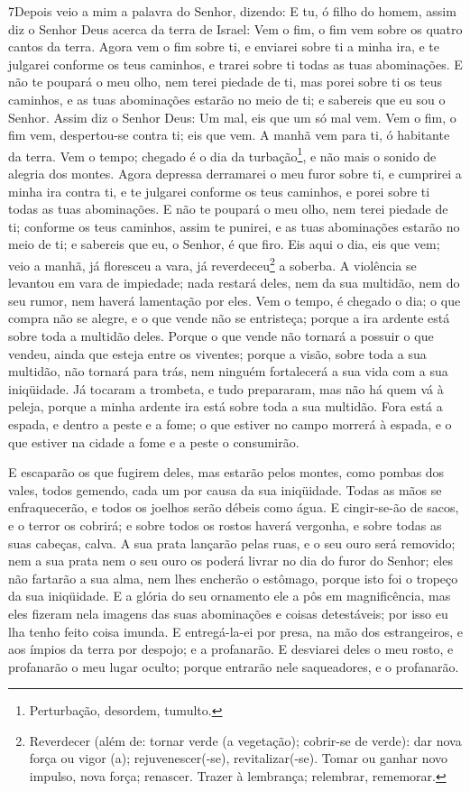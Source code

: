 \lettrine{7} Depois veio a mim a palavra do Senhor, dizendo:
E tu, ó filho do homem, assim diz o Senhor Deus acerca da terra
de Israel: Vem o fim, o fim vem sobre os quatro cantos da terra.
Agora vem o fim sobre ti, e enviarei sobre ti a minha ira, e te
julgarei conforme os teus caminhos, e trarei sobre ti todas as tuas
abominações. E não te poupará o meu olho, nem terei piedade de
ti, mas porei sobre ti os teus caminhos, e as tuas abominações
estarão no meio de ti; e sabereis que eu sou o Senhor. Assim diz
o Senhor Deus: Um mal, eis que um só mal vem. Vem o fim, o fim
vem, despertou-se contra ti; eis que vem. A manhã vem para ti, ó
habitante da terra. Vem o tempo; chegado é o dia da
turbação\footnote{Perturbação, desordem, tumulto.}, e não mais o
sonido de alegria dos montes. Agora depressa derramarei o meu
furor sobre ti, e cumprirei a minha ira contra ti, e te julgarei
conforme os teus caminhos, e porei sobre ti todas as tuas
abominações. E não te poupará o meu olho, nem terei piedade de
ti; conforme os teus caminhos, assim te punirei, e as tuas
abominações estarão no meio de ti; e sabereis que eu, o Senhor, é
que firo. Eis aqui o dia, eis que vem; veio a manhã, já
floresceu a vara, já reverdeceu\footnote{Reverdecer (além de: tornar
verde (a vegetação); cobrir-se de verde): dar nova força ou vigor
(a); rejuvenescer(-se), revitalizar(-se). Tomar ou ganhar novo
impulso, nova força; renascer. Trazer à lembrança; relembrar,
rememorar.} a soberba. A violência se levantou em vara de
impiedade; nada restará deles, nem da sua multidão, nem do seu
rumor, nem haverá lamentação por eles. Vem o tempo, é chegado
o dia; o que compra não se alegre, e o que vende não se entristeça;
porque a ira ardente está sobre toda a multidão deles. Porque
o que vende não tornará a possuir o que vendeu, ainda que esteja
entre os viventes; porque a visão, sobre toda a sua multidão, não
tornará para trás, nem ninguém fortalecerá a sua vida com a sua
iniqüidade. Já tocaram a trombeta, e tudo prepararam, mas não
há quem vá à peleja, porque a minha ardente ira está sobre toda a
sua multidão. Fora está a espada, e dentro a peste e a fome;
o que estiver no campo morrerá à espada, e o que estiver na cidade a
fome e a peste o consumirão.

E escaparão os que fugirem deles, mas estarão pelos montes, como
pombas dos vales, todos gemendo, cada um por causa da sua
iniqüidade. Todas as mãos se enfraquecerão, e todos os
joelhos serão débeis como água. E cingir-se-ão de sacos, e o
terror os cobrirá; e sobre todos os rostos haverá vergonha, e sobre
todas as suas cabeças, calva. A sua prata lançarão pelas
ruas, e o seu ouro será removido; nem a sua prata nem o seu ouro os
poderá livrar no dia do furor do Senhor; eles não fartarão a sua
alma, nem lhes encherão o estômago, porque isto foi o tropeço da sua
iniqüidade. E a glória do seu ornamento ele a pôs em
magnificência, mas eles fizeram nela imagens das suas abominações e
coisas detestáveis; por isso eu lha tenho feito coisa imunda.
E entregá-la-ei por presa, na mão dos estrangeiros, e aos
ímpios da terra por despojo; e a profanarão. E desviarei
deles o meu rosto, e profanarão o meu lugar oculto; porque entrarão
nele saqueadores, e o profanarão.

